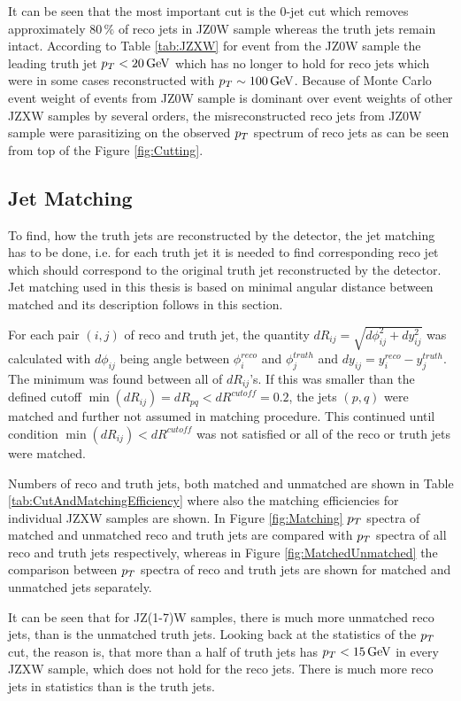 It can be seen that the most important cut is the 0-jet cut which removes
approximately $80\,\%$ of reco jets in JZ0W sample whereas the truth jets
remain intact. According to Table \ref{tab:JZXW} for event from the JZ0W sample
the leading truth jet $p_{T} < 20 \,\text{GeV}$ which has no longer to hold for reco
jets which were in some cases reconstructed with $p_{T} \sim 100 \,\text{GeV}$. Because of
Monte Carlo event weight of events from JZ0W sample is dominant over event
weights of other JZXW samples by several orders, the misreconstructed reco
jets from JZ0W sample were parasitizing on the observed $p_{T}$ spectrum of reco
jets as can be seen from top of the Figure \ref{fig:Cutting}.

\subsection{Jet Matching}
\label{SubSec:JetMatching}

To find, how the truth jets are reconstructed by the detector, the jet matching
has to be done, i.e. for each truth jet it is needed to find corresponding reco
jet which should correspond to the original truth jet reconstructed by the
detector. Jet matching used in this thesis is based on minimal angular distance
between matched and its description follows in this section.

For each pair $(i,j)$ of reco and truth jet, the quantity $dR_{ij} =
\sqrt{d\phi_{ij}^2 + dy_{ij}^2}$ was calculated with $d\phi_{ij}$ being angle
between $\phi_i^{reco}$ and $\phi_j^{truth}$ and $dy_{ij} = y_i^{reco} -
y_j^{truth}$.  The minimum was found between all of $dR_{ij}$'s. If this was
smaller than the defined cutoff $\min(dR_{ij}) = dR_{pq} < dR^{cutoff} = 0.2$,
the jets $(p,q)$ were matched and further not assumed in matching procedure.
This continued until condition $\min(dR_{ij}) < dR^{cutoff}$ was not satisfied
or all of the reco or truth jets were matched.

Numbers of reco and truth jets, both matched and unmatched are shown in Table
\ref{tab:CutAndMatchingEfficiency} where also the matching efficiencies for
individual JZXW samples are shown. In Figure \ref{fig:Matching} $p_{T}$ spectra of
matched and unmatched reco and truth jets are compared with $p_{T}$ spectra of
all reco and truth jets respectively, whereas in Figure
\ref{fig:MatchedUnmatched} the comparison between $p_{T}$ spectra of reco and
truth jets are shown for matched and unmatched jets separately.

It can be seen that for JZ(1-7)W samples, there is much more unmatched reco
jets, than is the unmatched truth jets. Looking back at the statistics of the
$p_{T}$ cut, the reason is, that more than a half of truth jets has $p_{T} < 15
\,\text{GeV}$ in every JZXW sample, which does not hold for the reco jets. There is
much more reco jets in statistics than is the truth jets. 

